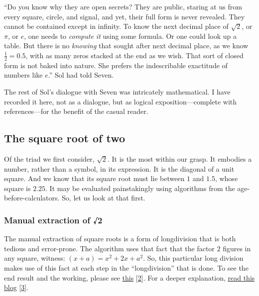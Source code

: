 \documentclass[
  a4paper,
]{article}
\begin{document}
``Do you know why they are open secrets? They are public, staring at us
from every square, circle, and signal, and yet, their full form is never
revealed. They cannot be contained except in infinity. To know the next
decimal place of \(\sqrt{2}\), or \(\pi\), or \(e\), one needs to
\emph{compute it} using some formula. Or one could look up a table. But
there is no \emph{knowing} that sought after next decimal place, as we
know \(\frac{1}{2} = 0.5\), with as many zeros stacked at the end as we
wish. That sort of closed form is not baked into nature. She prefers the
indescribable exactitude of numbers like \(e\).'' Sol had told Seven.

The rest of Sol's dialogue with Seven was intricately mathematical. I
have recorded it here, not as a dialogue, but as logical
exposition---complete with references---for the benefit of the casual
reader.

\hypertarget{the-square-root-of-two}{%
\subsection{The square root of two}\label{the-square-root-of-two}}

Of the triad we first consider, \(\sqrt{2}\). It is the most within our
grasp. It embodies a number, rather than a symbol, in its expression. It
is the diagonal of a unit square. And we know that its square root must
lie between \(1\) and \(1.5\), whose square is \(2.25\). It may be
evaluated painstakingly using algorithms from the
age-before-calculators. So, let us look at that first.

\hypertarget{manual-extraction-of-2}{%
\subsubsection{Manual extraction of √2}\label{manual-extraction-of-2}}

The manual extraction of square roots is a form of longdivision that is
both tedious and error-prone. The algorithm uses that fact that the
factor \(2\) figures in any square, witness:
\((x + a) = x^2 + 2x +a^2\). So, this particular long division makes use
of this fact at each step in the ``longdivision'' that is done. To see
the end result and the working, please see
\href{https://www.cuemath.com/algebra/square-root-of-2/}{this}
{[}\protect\hyperlink{ref-cuemathsqrt}{2}{]}. For a deeper explanation,
\href{https://www.cantorsparadise.com/the-square-root-algorithm-f97ab5c29d6d}{read
this blog} {[}\protect\hyperlink{ref-ujjwalsingh2021}{3}{]}.
\end{document}
